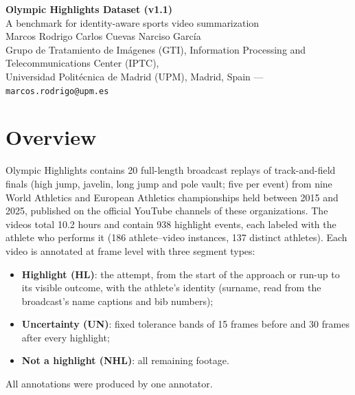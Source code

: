 \documentclass[11pt,a4paper]{article}
\begin{document}
\begin{center}
{\LARGE\bfseries Olympic Highlights Dataset (v1.1)}\\[4pt]
{\large A benchmark for identity-aware sports video summarization}\\[6pt]
Marcos Rodrigo \quad Carlos Cuevas \quad Narciso Garc\'{i}a\\
Grupo de Tratamiento de Im\'{a}genes (GTI), Information Processing and Telecommunications Center (IPTC),\\ Universidad Polit\'{e}cnica de Madrid (UPM), Madrid, Spain --- \texttt{marcos.rodrigo@upm.es}
\end{center}

\section*{Overview}
Olympic Highlights contains 20 full-length broadcast replays of track-and-field finals (high jump, javelin, long jump and pole vault; five per event) from nine World Athletics and European Athletics championships held between 2015 and 2025, published on the official YouTube channels of these organizations. The videos total 10.2 hours and contain 938 highlight events, each labeled with the athlete who performs it (186 athlete--video instances, 137 distinct athletes). Each video is annotated at frame level with three segment types:
\begin{itemize}
\item \textbf{Highlight (HL)}: the attempt, from the start of the approach or run-up to its visible outcome, with the athlete's identity (surname, read from the broadcast's name captions and bib numbers);
\item \textbf{Uncertainty (UN)}: fixed tolerance bands of 15 frames before and 30 frames after every highlight;
\item \textbf{Not a highlight (NHL)}: all remaining footage.
\end{itemize}
All annotations were produced by one annotator.
\end{document}
